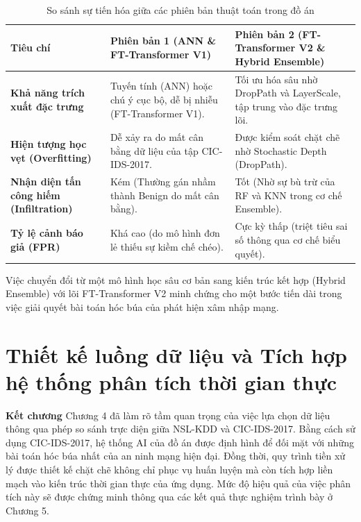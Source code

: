 \documentclass[../DoAn.tex]{subfiles}
\begin{document}
\begin{table}[htbp]
\centering
\caption{So sánh sự tiến hóa giữa các phiên bản thuật toán trong đồ án}
\label{tab:model_comparison}
\begin{tabular}{|p{3.5cm}|p{4.5cm}|p{6cm}|}
\hline
\textbf{Tiêu chí} & \textbf{Phiên bản 1 (ANN \& FT-Transformer V1)} & \textbf{Phiên bản 2 (FT-Transformer V2 \& Hybrid Ensemble)} \\
\hline
\textbf{Khả năng trích xuất đặc trưng} & Tuyến tính (ANN) hoặc chú ý cục bộ, dễ bị nhiễu (FT-Transformer V1). & Tối ưu hóa sâu nhờ DropPath và LayerScale, tập trung vào đặc trưng lõi. \\
\hline
\textbf{Hiện tượng học vẹt (Overfitting)} & Dễ xảy ra do mất cân bằng dữ liệu của tập CIC-IDS-2017. & Được kiểm soát chặt chẽ nhờ Stochastic Depth (DropPath). \\
\hline
\textbf{Nhận diện tấn công hiếm (Infiltration)} & Kém (Thường gán nhầm thành Benign do mất cân bằng). & Tốt (Nhờ sự bù trừ của RF và KNN trong cơ chế Ensemble). \\
\hline
\textbf{Tỷ lệ cảnh báo giả (FPR)} & Khá cao (do mô hình đơn lẻ thiếu sự kiềm chế chéo). & Cực kỳ thấp (triệt tiêu sai số thông qua cơ chế biểu quyết). \\
\hline
\end{tabular}
\end{table}

Việc chuyển đổi từ một mô hình học sâu cơ bản sang kiến trúc kết hợp (Hybrid Ensemble) với lõi FT-Transformer V2 minh chứng cho một bước tiến dài trong việc giải quyết bài toán hóc búa của phát hiện xâm nhập mạng.

\section{Thiết kế luồng dữ liệu và Tích hợp hệ thống phân tích thời gian thực}

\vspace{1em}
\textbf{Kết chương}
Chương 4 đã làm rõ tầm quan trọng của việc lựa chọn dữ liệu thông qua phép so sánh trực diện giữa NSL-KDD và CIC-IDS-2017. Bằng cách sử dụng CIC-IDS-2017, hệ thống AI của đồ án được định hình để đối mặt với những bài toán hóc búa nhất của an ninh mạng hiện đại. Đồng thời, quy trình tiền xử lý được thiết kế chặt chẽ không chỉ phục vụ huấn luyện mà còn tích hợp liền mạch vào kiến trúc thời gian thực của ứng dụng. Mức độ hiệu quả của việc phân tích này sẽ được chứng minh thông qua các kết quả thực nghiệm trình bày ở Chương 5.
\end{document}
